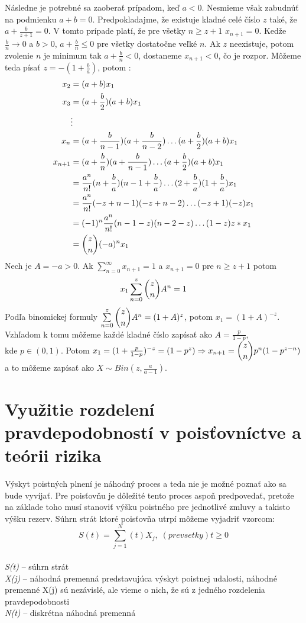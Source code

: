 \documentclass[a4paper,10pt]{article}
\theoremstyle{plain}
\theoremstyle{definition}
\begin{document}
Následne je potrebné sa zaoberať prípadom, keď $ a<0 $. Nesmieme však zabudnúť na podmienku $ a+b=0 $.
Predpokladajme, že existuje kladné celé číslo $ z $ také, že $ a + \frac{b}{z+1} = 0 $. V tomto prípade
platí, že pre všetky $ n\geq z+1  $ $ x_{n+1} = 0 $.
Kedže $ \frac{b}{n} \rightarrow 0$ a $ b>0 $, $a + \frac{b}{n} \leq 0$ pre všetky dostatočne veľké $ n $. Ak $ z $ neexistuje,
potom zvolenie $ n $ je minimum tak $ a+\frac{b}{n} <0$, dostaneme $ x_{n+1} <0 $, čo je rozpor.
Môžeme teda písať $ z = -(1+\frac{b}{a}) $, potom :
\begin{align*}
x_{2}&=(a+b)\*x_{1} \\
x_{3}&=(a + \frac{b}{2}) \* (a + b)\*x_{1}\\
&\vdots \\
x_{n} &= (a+\frac{b}{n-1})\*(a+\frac{b}{n-2})\ldots  (a + \frac{b}{2})\*(a+b)\*x_{1}\\
x_{n+1} &= (a + \frac{b}{n})\*(a + \frac{b}{n-1})\ldots (a + \frac{b}{2})\*(a+b)\*x_{1}\\
&= \frac{a^{n}}{n!}\*(n + \frac{b}{a})\*(n-1+\frac{b}{a}) \ldots (2+\frac{b}{a})\*(1+\frac{b}{a})\*x_{1} \\
&= \frac{a^{n}}{n!}\*(-z+n-1)\*(-z+n-2) \ldots (-z+1)\*(-z)\*x_{1} \\
&= (-1)^{n}\*\frac{a^{n}}{n!}\*(n-1-z)\*(n-2-z)\ldots(1-z)\*z*x_{1} \\
&= \dbinom{z}{n}\*(-a)^{n}\*x_{1}  \\
\end{align*}
\noindent Nech je $ A = -a >0 $. Ak $ \sum\limits_{n=0}^\infty x_{n+1} = 1 $ a $ x_{n+1} = 0 $ pre $ n\geq z+1 $ potom 
$$ x_{1} \sum\limits_{n=0}^z \dbinom{z}{n} A^{n}= 1 $$\newpage
\noindent Podľa binomickej formuly $ \sum\limits_{n=0}^z \dbinom{z}{n} A^{n}= (1+A)^{z} $, potom $ x_{1} = (1+A)^{-z} $.
Vzhľadom k tomu môžeme každé kladné číslo zapísať ako $ A = \frac{p}{1-p} $,\\ kde $ p \in (0,1) $. Potom
$ x_{1} = (1 + \frac{p}{1-p})^{-z} = (1-p^{z}) \Rightarrow x_{n+1} = \dbinom{z}{n}\*p^{n}\*(1-p^{z-n}) $ a to 
môžeme zapísať ako $ X \sim Bin(z,\frac{a}{a-1}) $.%
\newpage %
\section{Využitie rozdelení pravdepodobností v poisťovníctve a teórii rizika} %
Výskyt poistných plnení je náhodný proces a teda nie je možné poznať ako sa bude vyvíjať. Pre poisťovňu je dôležité tento proces aspoň predpovedať, pretože na základe toho musí stanoviť výšku poistného pre jednotlivé zmluvy a takisto výšku rezerv. 
Súhrn strát ktoré poisťovňa utrpí môžeme vyjadriť vzorcom:
$$ S(t) = \sum\limits_{j=1}^N(t) X_{j},\; (prevsetky)t\geq0 $$\\
\textit{S(t)} – súhrn strát \\
\textit{X(j)} – náhodná premenná predstavujúca výskyt poistnej udalosti, náhodné premenné X(j) sú nezávislé, ale vieme o nich, že sú  z jedného rozdelenia pravdepodobnosti\\
\textit{N(t)} – diskrétna náhodná premenná\\
\end{document}
